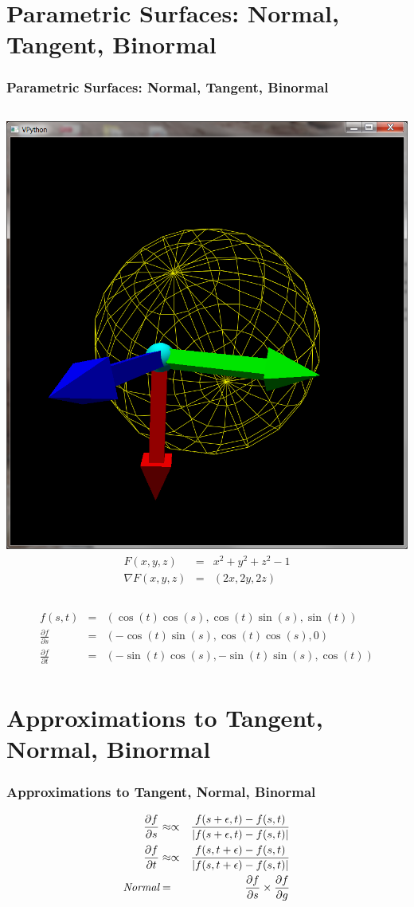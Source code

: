 \documentclass[slidestop,xcolor=pst]{beamer}
\newcommand{\sect}[1]{
\section{#1}
\begin{frame}[fragile]\frametitle{#1}
}
\begin{document}
\sect{Parametric Surfaces: Normal, Tangent, Binormal}
\begin{columns}[c]
\includegraphics[width=\textwidth]{images/vpythonpsphere.png}
\begin{eqnarray*}
F(x,y,z) &=& x^2 + y^2 + z^2 - 1 \\
\nabla F(x,y,z) &=& (2x, 2y, 2z)
\end{eqnarray*}
\end{columns}
\begin{eqnarray*}
f(s,t) &=& (\cos(t)\cos(s),\cos(t)\sin(s),\sin(t))\\
\frac{\partial f}{\partial s} &=& (-\cos(t)\sin(s),
                                   \cos(t)\cos(s),
                                   0)\\
\frac{\partial f}{\partial t} &=& (-\sin(t)\cos(s),
                                   -\sin(t)\sin(s),
                                    \cos(t))\\
\end{eqnarray*}
\end{frame}

\sect{Approximations to Tangent, Normal, Binormal}
\begin{eqnarray*}
\frac{\partial f}{\partial s} &\approx\propto&
\frac{f(s+\epsilon, t) - f(s,t)}{|f(s+\epsilon, t) - f(s,t)|}\\
\frac{\partial f}{\partial t} &\approx\propto&
\frac{f(s, t+\epsilon) - f(s,t)}{|f(s, t+\epsilon) - f(s,t)|}\\
\mbox{\it Normal} &=& \frac{\partial f}{\partial s} \times \frac{\partial f}{\partial g}
\end{eqnarray*}
\end{frame}
\end{document}

